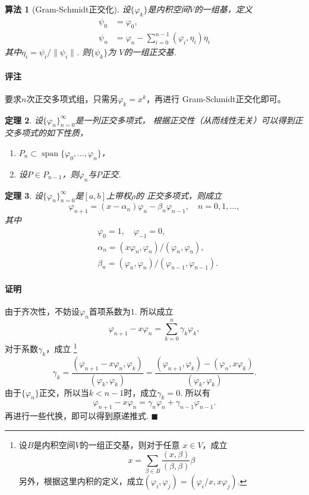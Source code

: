 \documentclass[12pt, a4paper]{article}
\theoremstyle{margin}
\newtheorem{thm}{定理}
\newtheorem{alg}[thm]{算法}
\DeclareMathOperator{\spn}{span}
\newcommand{\remark}{\paragraph{评注}}
\newcommand{\proof}{\paragraph{证明}}
\begin{document}
  \begin{alg}[Gram-Schmidt正交化]
    设$\{\varphi_k\}$是内积空间$V$的一组基，定义
    \[\begin{split}
      \psi_0 &= \varphi_0, \\
      \psi_{n} &= \varphi_n - \sum_{i=0}^{n-1}(\varphi_i, \eta_i)\eta_i
    \end{split}\]
    其中$\eta_i = \psi_i / \|\psi_i\|$. 则$\{\psi_k\}$为
    $V$的一组正交基.
  \end{alg}
  \remark
    要求$n$次正交多项式组，只需另$\varphi_k = x^k$，再进行
    Gram-Schmidt正交化即可。

  \begin{thm}
    设$\{\varphi_n\}_{n=0}^\infty$是一列正交多项式，
    根据正交性（从而线性无关）可以得到正交多项式的如下性质，
    \begin{enumerate}
      \item $P_n \subset \spn\{\varphi_0, \dots,\varphi_n\}$，
      \item 设$P\in P_{n-1}$，则$\varphi_n$与$P$正交.
    \end{enumerate}
  \end{thm}

  \begin{thm}
    设$\{\varphi_n\}_{n=0}^\infty$是$[a,b]$上带权$\rho$的
    正交多项式，则成立
    \[
      \varphi_{n+1} = (x-\alpha_n)\varphi_n - \beta_n\varphi_{n-1},
      \quad n = 0, 1,\dots,
    \]
    其中
    \[\begin{split}
      &\varphi_0 = 1,\quad \varphi_{-1} = 0,\\
      &\alpha_n = (x\varphi_n, \varphi_n) / (\varphi_n, \varphi_n),\\
      &\beta_n = (\varphi_n, \varphi_n) / (\varphi_{n-1}, \varphi_{n-1}).
    \end{split}\]
  \end{thm}
  \proof
    由于齐次性，不妨设$\varphi_n$首项系数为$1$. 所以成立
    \[
      \varphi_{n+1}-x\varphi_n = \sum_{k=0}^n\gamma_k\varphi_k,
    \]
    对于系数$\gamma_k$，成立
    \footnote{
      设$B$是内积空间$V$的一组正交基，则对于任意
      $x\in V$，成立
      \[
        x = \sum_{\beta\in B}\frac{(x,\beta)}{(\beta,\beta)}\beta
      \]
      另外，根据这里内积的定义，成立$(\varphi_i,\varphi_j)
      =(\varphi_i/x, x\varphi_j)$.
    }
    \[
      \gamma_k = \frac{(\varphi_{n+1}-x\varphi_n,\varphi_k)}
      {(\varphi_k, \varphi_k)}
      = \frac{(\varphi_{n+1},\varphi_k) - (\varphi_n, x\varphi_k)}{(\varphi_k,\varphi_k)}.
    \]
    由于$\{\varphi_n\}$正交，所以当$k<n-1$时，成立$\gamma_k=0$.
    所以有
    \[
      \varphi_{n+1} - x\varphi_n = \gamma_n\varphi_n + \gamma_{n-1}\varphi_{n-1}.
    \]
    再进行一些代换，即可以得到原递推式. $\blacksquare$
\end{document}
